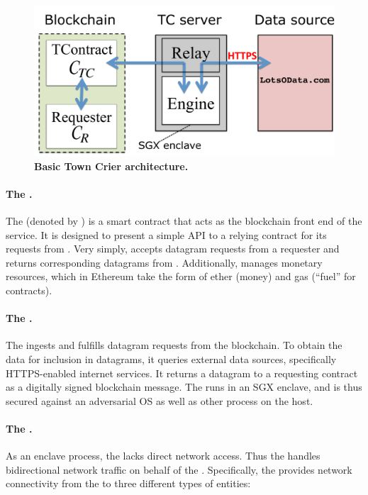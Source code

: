 {\vspace{-2mm}
\begin{figure}[h!]
\centering
\includegraphics[width=\columnwidth]{figures/OverviewFig}
\caption{{\bf Basic Town Crier architecture.}}
\label{fig:overview}
\end{figure}
\vspace{-2mm}

\paragraph{The \tcontract \tcont.} The \tcontract (denoted by \tcont) is a smart contract that acts as the blockchain front end of the \tc service. It is designed to present a simple API to a relying contract \reqcont for its requests from \tc. Very simply, \tcont accepts datagram requests from a requester \reqcont and returns corresponding datagrams from \tc. Additionally, \tcont manages \tc monetary resources, which in Ethereum take the form of ether (money) and gas (``fuel'' for contracts).

\paragraph{The \encname \engine.}
The \encname  ingests and fulfills datagram requests from the blockchain. To obtain the data for inclusion in datagrams, it queries external data sources, specifically HTTPS-enabled internet services. It returns a datagram to a requesting contract \reqcont as a digitally signed blockchain message. The \encname runs in an SGX enclave, and is thus secured against an adversarial OS as well as other process on the host. 

\paragraph{The \medname \relay.} As an enclave process, the \encname lacks direct network access. Thus the \medname handles bidirectional network traffic on behalf of the \encname. Specifically, the \medname provides network connectivity from the \encname to three different types of entities: 

}
